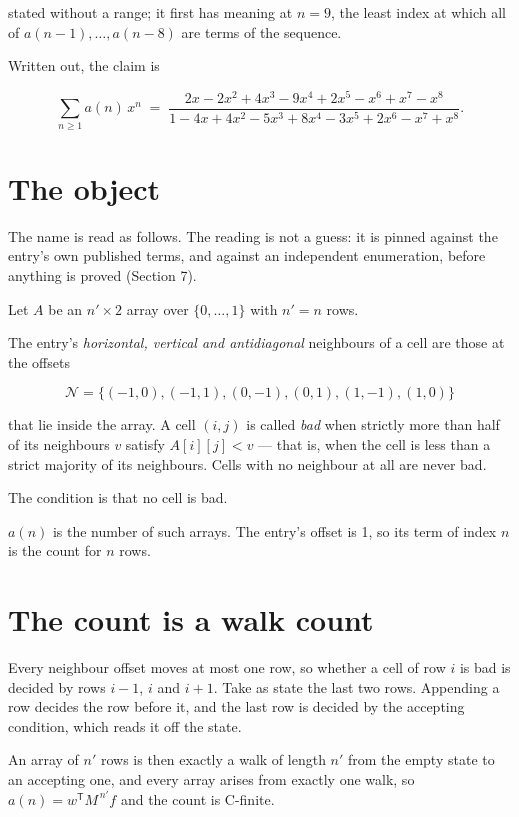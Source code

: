\documentclass[11pt]{article}
\theoremstyle{definition}
\begin{document}
stated without a range; it first has meaning at $n = 9$, the least index at which all of $a(n-1),\dots,a(n-8)$ are terms of the sequence.

Written out, the claim is

\[\sum_{n \ge 1} a(n)\,x^n \;=\; \frac{2x - 2x^{2} + 4x^{3} - 9x^{4} + 2x^{5} - x^{6} + x^{7} - x^{8}}{1 - 4x + 4x^{2} - 5x^{3} + 8x^{4} - 3x^{5} + 2x^{6} - x^{7} + x^{8}}.\]

\section{The object}

The name is read as follows. The reading is not a guess: it is pinned against the entry's own published terms, and against an independent enumeration, before anything is proved (Section 7).

Let $A$ be an $n' \times 2$ array over $\{0,\dots,1\}$ with $n' = n$ rows.

The entry's {\itshape horizontal, vertical and antidiagonal} neighbours of a cell are those at the offsets

\[\mathcal{N} = \{(-1,0), (-1,1), (0,-1), (0,1), (1,-1), (1,0)\}\]

that lie inside the array. A cell $(i,j)$ is called {\itshape bad} when strictly more than half of its neighbours $v$ satisfy $A[i][j] < v$ --- that is, when the cell is less than a strict majority of its neighbours. Cells with no neighbour at all are never bad.

The condition is that no cell is bad.

$a(n)$ is the number of such arrays. The entry's offset is 1, so its term of index $n$ is the count for $n$ rows.

\section{The count is a walk count}

Every neighbour offset moves at most one row, so whether a cell of row $i$ is bad is decided by rows $i-1$, $i$ and $i+1$. Take as state the last two rows. Appending a row decides the row before it, and the last row is decided by the accepting condition, which reads it off the state.

An array of $n'$ rows is then exactly a walk of length $n'$ from the empty state to an accepting one, and every array arises from exactly one walk, so $a(n) = w^{\mathsf T}M^{\,n'}f$ and the count is C-finite.
\end{document}
